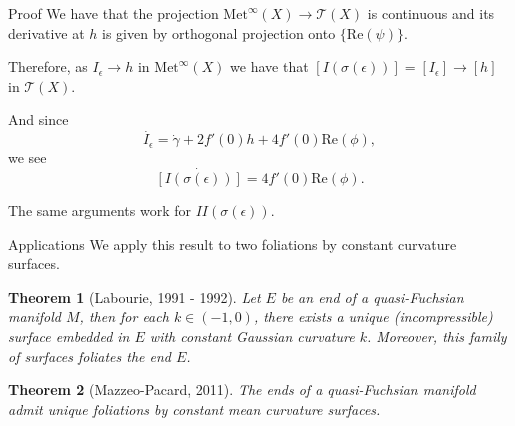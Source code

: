 \documentclass[professionalfont]{beamer}
\newtheorem*{thm*}{Theorem}
\newcommand{\two}{I\!I}
\begin{document}
\begin{frame}{Proof}
We have that the projection $\mathrm{Met}^\infty(X) \to \mathcal{T}(X)$ is continuous and its derivative at $h$ is given by orthogonal projection onto $\{ \mathrm{Re}(\psi) \}$.
\newline

Therefore, as $I_\epsilon \to h$ in $\mathrm{Met}^\infty(X)$ we have that $[I(\sigma(\epsilon))] = [I_\epsilon] \to [h]$ in $\mathcal{T}(X)$. \pause

\vspace{0.5cm}
 
And since
\[
\dot{I_\epsilon}  = \dot{\gamma} + 2 f'(0) h + 4 f'(0) \mathrm{Re}(\phi), 
\]
we see
\[
\dot{[I(\sigma(\epsilon))]} = 4f'(0)\mathrm{Re}(\phi).
\] \pause

\vspace{1cm}

The same arguments work for $\two(\sigma(\epsilon))$.

\end{frame}




\begin{frame}{Applications}
We apply this result to two foliations by constant curvature surfaces.
\newline \pause
	
	\begin{thm*}[Labourie, 1991 - 1992]
Let $E$ be an end of a quasi-Fuchsian manifold $M$, then for each $k \in (-1,0)$, there exists a unique (incompressible) surface embedded in $E$ with constant Gaussian curvature $k$. Moreover, this family of surfaces foliates the end $E$.
\end{thm*}\pause

\vspace{0.5cm}

\begin{thm*}[Mazzeo-Pacard, 2011]
The ends of a quasi-Fuchsian manifold admit unique foliations by constant mean curvature surfaces. 
\end{thm*}

	
\end{frame}




%
%
%
%
\end{document}

